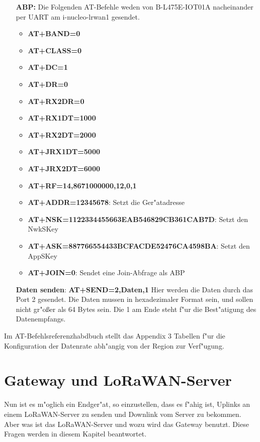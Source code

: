\begin{itemize}
	\item[\textbf{ABP:}] Die Folgenden AT-Befehle weden von
	B-L475E-IOT01A nacheinander  per UART am i-nucleo-lrwan1 gesendet.
	\begin{itemize}
		\item \textbf{AT+BAND=0}
		\item \textbf{AT+CLASS=0} 
		\item \textbf{AT+DC=1}
		\item \textbf{AT+DR=0} 
		\item \textbf{AT+RX2DR=0}
		\item \textbf{AT+RX1DT=1000} 
		\item \textbf{AT+RX2DT=2000} 
		\item \textbf{AT+JRX1DT=5000}
		\item \textbf{AT+JRX2DT=6000} 
		\item \textbf{AT+RF=14,8671000000,12,0,1}
		\item \textbf{AT+ADDR=12345678}: Setzt die Ger"atadresse 
		\item \textbf{AT+NSK=1122334455663EAB546829CB361CAB7D}: Setzt
		den NwkSKey
		\item \textbf{AT+ASK=887766554433BCFACDE52476CA4598BA}: Setzt
		den AppSKey 
		\item \textbf{AT+JOIN=0}: Sendet eine Join-Abfrage als ABP
	\end{itemize}

	\item[\textbf{Daten senden}:] \textbf{AT+SEND=2,Daten,1}
	Hier werden die Daten durch das Port 2 gesendet. Die Daten mussen in
	hexadezimaler Format sein, und sollen nicht gr"o\ss{}er als 64 Bytes
	sein. Die 1 am Ende steht f"ur die Best"atigung des Datenempfangs. 
	
\end{itemize}

Im AT-Befehlsreferenzhabdbuch stellt das Appendix 3 Tabellen f"ur die
Konfiguration der Datenrate abh"angig von der Region zur Verf"ugung.

\chapter{Gateway und LoRaWAN-Server}\label{G_S}

Nun ist es m"oglich ein Endger"at, so einzustellen, dass es f"ahig ist,
Uplinks an einem LoRaWAN-Server zu senden und Downlink vom Server zu
bekommen. Aber was ist das LoRaWAN-Server und wozu wird das Gateway
benutzt. Diese Fragen werden in diesem Kapitel beantwortet.

